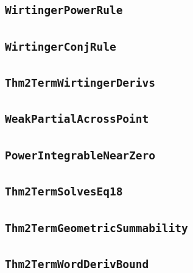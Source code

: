 \documentclass[11pt]{amsart}
\theoremstyle{definition}
\begin{document}
\subsection{\texorpdfstring{\texttt{WirtingerPowerRule}}{WirtingerPowerRule}}\label{node:WirtingerPowerRule}


\subsection{\texorpdfstring{\texttt{WirtingerConjRule}}{WirtingerConjRule}}\label{node:WirtingerConjRule}


\subsection{\texorpdfstring{\texttt{Thm2TermWirtingerDerivs}}{Thm2TermWirtingerDerivs}}\label{node:Thm2TermWirtingerDerivs}


\subsection{\texorpdfstring{\texttt{WeakPartialAcrossPoint}}{WeakPartialAcrossPoint}}\label{node:WeakPartialAcrossPoint}


\subsection{\texorpdfstring{\texttt{PowerIntegrableNearZero}}{PowerIntegrableNearZero}}\label{node:PowerIntegrableNearZero}


\subsection{\texorpdfstring{\texttt{Thm2TermSolvesEq18}}{Thm2TermSolvesEq18}}\label{node:Thm2TermSolvesEq18}


\subsection{\texorpdfstring{\texttt{Thm2TermGeometricSummability}}{Thm2TermGeometricSummability}}\label{node:Thm2TermGeometricSummability}


\subsection{\texorpdfstring{\texttt{Thm2TermWordDerivBound}}{Thm2TermWordDerivBound}}\label{node:Thm2TermWordDerivBound}

\end{document}
